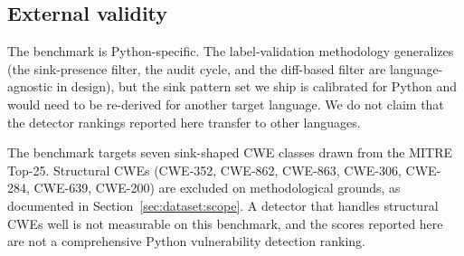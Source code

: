 \subsection{External validity}
\label{sec:threats:external}

The benchmark is Python-specific. The label-validation methodology
generalizes (the sink-presence filter, the audit cycle, and the
diff-based filter are language-agnostic in design), but the sink
pattern set we ship is calibrated for Python and would need to be
re-derived for another target language. We do not claim that the
detector rankings reported here transfer to other languages.

The benchmark targets seven sink-shaped CWE classes drawn from the
MITRE Top-25. Structural CWEs (CWE-352, CWE-862, CWE-863, CWE-306,
CWE-284, CWE-639, CWE-200) are excluded on methodological grounds, as
documented in Section~\ref{sec:dataset:scope}. A detector that handles
structural CWEs well is not measurable on this benchmark, and the
scores reported here are not a comprehensive Python vulnerability
detection ranking.

